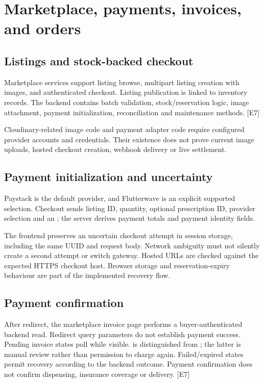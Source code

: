 \documentclass[11pt,a4paper]{article}
\newcommand{\source}[1]{{\small\path{#1}}}
\newcommand{\evidence}[1]{\textcolor{muted}{[E#1]}}
\begin{document}
\section{Marketplace, payments, invoices, and orders}
\subsection{Listings and stock-backed checkout}
Marketplace services support listing browse, multipart listing creation with images, and authenticated checkout. Listing publication is linked to inventory records. The backend contains batch validation, stock/reservation logic, image attachment, payment initialization, reconciliation and maintenance methods. \evidence{7}

Cloudinary-related image code and payment adapter code require configured provider accounts and credentials. Their existence does not prove current image uploads, hosted checkout creation, webhook delivery or live settlement.

\subsection{Payment initialization and uncertainty}
Paystack is the default provider, and Flutterwave is an explicit supported selection. Checkout sends listing ID, quantity, optional prescription ID, provider selection and an \source{Idempotency-Key}; the server derives payment totals and payment identity fields.

The frontend preserves an uncertain checkout attempt in session storage, including the same UUID and request body. Network ambiguity must not silently create a second attempt or switch gateway. Hosted URLs are checked against the expected HTTPS checkout host. Browser storage and reservation-expiry behaviour are part of the implemented recovery flow.

\subsection{Payment confirmation}
After redirect, the marketplace invoice page performs a buyer-authenticated backend read. Redirect query parameters do not establish payment success. Pending invoice states poll while visible. \source{PAID} is distinguished from \source{PAID_REVIEW}; the latter is manual review rather than permission to charge again. Failed/expired states permit recovery according to the backend outcome. Payment confirmation does not confirm dispensing, insurance coverage or delivery. \evidence{7}
\end{document}
